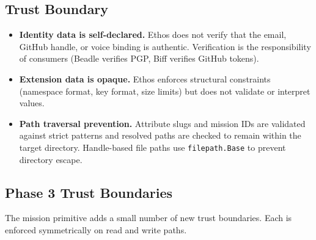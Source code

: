 \documentclass[a4paper,10pt]{article}
\begin{document}
\subsection{Trust Boundary}

\begin{itemize}
  \item \textbf{Identity data is self-declared.}  Ethos does not
    verify that the email, GitHub handle, or voice binding is
    authentic.  Verification is the responsibility of consumers
    (Beadle verifies PGP, Biff verifies GitHub tokens).
  \item \textbf{Extension data is opaque.}  Ethos enforces
    structural constraints (namespace format, key format, size
    limits) but does not validate or interpret values.
  \item \textbf{Path traversal prevention.}  Attribute slugs and
    mission IDs are validated against strict patterns and resolved
    paths are checked to remain within the target directory.
    Handle-based file paths use \texttt{filepath.Base} to prevent
    directory escape.
\end{itemize}

\subsection{Phase 3 Trust Boundaries}

The mission primitive adds a small number of new trust boundaries.
Each is enforced symmetrically on read and write paths.
\end{document}
